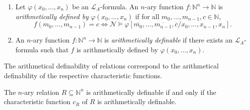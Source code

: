 \begin{dfn}
\begin{enumerate}
\item Let $\varphi(x_0, \ldots, x_{n})$ be an $\mathcal{L}_A$-formula. An $n$-ary function $f: \mathbb{N}^n \rightarrow \mathbb{N}$ is \textit{arithmetically defined by $\varphi(x_0, \ldots, x_{n})$} if for all $m_0, \ldots, m_{n-1}, c \in \mathbb{N}$,
\[f(m_0, \ldots, m_{n-1})=c \Leftrightarrow \mathcal{N} \vDash \varphi[\overline{m_0}, \ldots, \overline{m_{n-1}}, \overline{c}/x_0, \ldots, x_{n-1}, x_{n}]. \]
\item An $n$-ary function $f: \mathbb{N}^n \rightarrow \mathbb{N}$ is \textit{arithmetically definable} if there exists an $\mathcal{L}_A$-formula such that $f$ is arithmetically defined by $\varphi(x_0, \ldots, x_{n})$. 
\end{enumerate}
\end{dfn}

The arithmetical definability of relations correspond to the arithmetical definability of the respective characteristic functions.
\begin{lem}\label{lem:arithdef}
The $n$-ary relation $R \subseteq \mathbb{N}^n$ is arithmetically definable if and only if the characteristic function $c_R$ of $R$ is arithmetically definable.
\end{lem}

